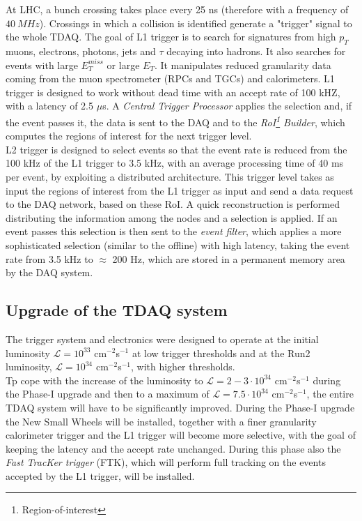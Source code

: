 \documentclass[a4paper,twoside,12pt]{book}
\begin{document}
At LHC, a bunch crossing takes place every 25 ns (therefore with a frequency of $40\ MHz$). Crossings in which a collision is identified generate a "trigger" signal to the whole TDAQ. The goal of L1 trigger is to search for signatures from high $p_{T}$ muons, electrons,
photons, jets and $\tau$ decaying into hadrons. It also searches for events with large $E_{T}^{miss}$ or large $E_{T}$. It manipulates reduced granularity data coming from the muon
spectrometer (RPCs and TGCs) and calorimeters. L1 trigger is designed to work without dead time with an accept rate of 100 kHZ, with a latency of 2.5 $\mu$s. A \textit{Central Trigger Processor} applies
the selection and, if the event passes it, the data is
sent to the DAQ and to the \textit{RoI\footnote{Region-of-interest} Builder}, which computes the regions of interest for the next trigger level.\\
L2 trigger is designed to select events so that the event rate is reduced from the 100 kHz of the L1 trigger to 3.5 kHz, with an average processing time of 40 ms per event, by
exploiting a distributed architecture. This trigger
level takes as input the regions of interest from the L1 trigger as input and send a data request to the DAQ network, based on these RoI. A quick reconstruction is performed
distributing the information among the nodes and a selection is applied. If an event passes this selection is then sent to the \textit{event filter}, which applies a more sophisticated selection 
(similar to the offline) with high latency, taking the event rate from 3.5 kHz to $\approx$ 200 Hz, which are stored in a permanent memory area by the DAQ system.

\subsection*{Upgrade of the TDAQ system}
The trigger system and electronics were designed to operate at the initial luminosity 
$\mathcal{L} = 10^{33}$ cm$^{-2}$s$^{-1}$ at low trigger thresholds and at the Run2
luminosity, $\mathcal{L} = 10^{34}$ cm$^{-2}$s$^{-1}$, with higher thresholds\cite{scoping}.\\

Tp cope with the increase of the luminosity to $\mathcal{L} = 2-3 \cdot 10^{34}$ cm$^{-2}$s$^{-1}$ during
the Phase-I upgrade and then to a maximum of $\mathcal{L} = 7.5 \cdot 10^{34}$ cm$^{-2}$s$^{-1}$, the entire TDAQ system will have to be significantly improved. During the Phase-I upgrade the New Small Wheels will be installed, together with a finer granularity calorimeter
trigger and the L1 trigger will become more selective, with the goal of keeping the latency and the accept rate unchanged. During this phase also the \textit{Fast TracKer trigger} (FTK)\cite{FTK_TDR}, which will perform
full tracking on the events accepted by the L1 trigger, will be installed. \\
\end{document}
